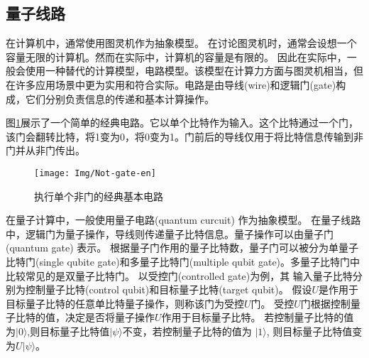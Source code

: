 \subsection{量子线路}
\label{sec-cir}
在计算机中，通常使用图灵机作为抽象模型。
在讨论图灵机时，通常会设想一个容量无限的计算机。然而在实际中，计算机的容量是有限的。
因此在实际中，一般会使用一种替代的计算模型，电路模型。该模型在计算力方面与图灵机相当，但在许多应用场景中更为实用和符合实际。电路是由导线(wire)和逻辑门(gate)构成，它们分别负责信息的传递和基本计算操作。
\begin{example}
    图\ref{fig-not}展示了一个简单的经典电路。它以单个比特作为输入。这个比特通过一个门，该门会翻转比特，将1变为0，将0变为1。门前后的导线仅用于将比特信息传输到非门并从非门传出。
\begin{figure}[htbp]
    \centering
    \texttt{[image: Img/Not-gate-en]}
    \caption{执行单个非门的经典基本电路}
    \label{fig-not}
\end{figure}
\end{example}

在量子计算中，一般使用量子电路(quantum curcuit) 作为抽象模型。
在量子线路中，逻辑门为量子操作，导线则传递量子比特信息。量子操作可以由量子门(quantum gate) 表示。
根据量子门作用的量子比特数，量子门可以被分为单量子比特门(single qubite gate)和多量子比特门(multiple qubit gate)。多量子比特门中比较常见的是双量子比特门。
以受控门(controlled gate)为例，其
输入量子比特分别为控制量子比特(control qubit)和目标量子比特(target qubit)。
假设$U $是作用于目标量子比特的任意单比特量子操作，则称该门为受控$U$门。
受控$U$门根据控制量子比特的值，决定是否将量子操作$U$作用于目标量子比特。
若控制量子比特的值为\(|0\rangle\),则目标量子比特值\(|\psi\rangle\)不变，若控制量子比特的值为
\(|1\rangle\), 则目标量子比特值变为\(U|\psi\rangle\)。

